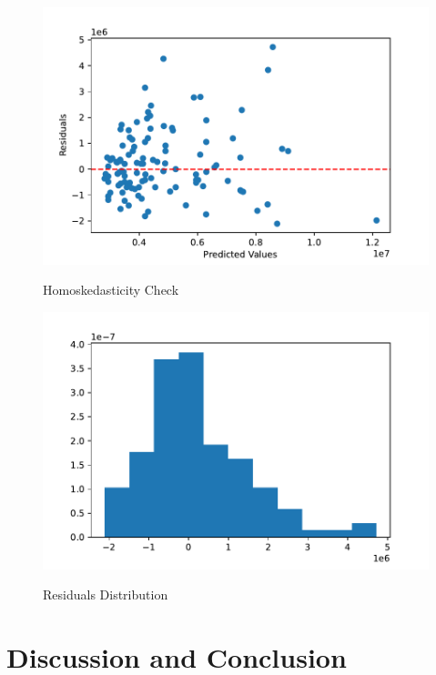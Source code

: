 \documentclass[12pt]{article}
\begin{document}
\begin{figure}[h!]
    \caption{Homoskedasticity Check}
    \includegraphics[width=1\textwidth]{homoskedasticity_check.pdf}
    \label{fig:homoskedasticity_check}
\end{figure}

\begin{figure}[h!]
    \caption{Residuals Distribution}
    \includegraphics[width=1\textwidth]{residuals_distribution.pdf}
    \label{fig:residuals_distribution}
\end{figure}

\section{Discussion and Conclusion}
\label{sec:disc}
\end{document}
